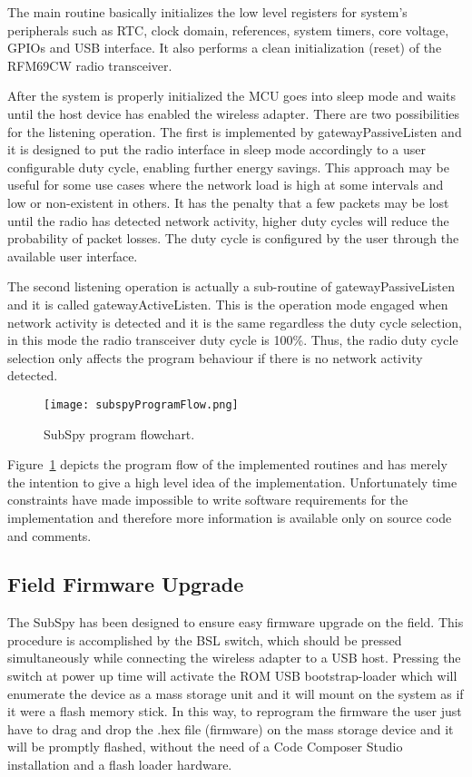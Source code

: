 \documentclass[12pt]{article}
\begin{document}
The main routine basically initializes the low level registers for system's peripherals such as RTC, clock domain, references, system timers, core voltage, GPIOs and USB interface. It also performs a clean initialization (reset) of the RFM69CW radio transceiver.

After the system is properly initialized the MCU goes into sleep mode and waits until the host device has enabled the wireless adapter. There are two possibilities for the listening operation. The first is implemented by gatewayPassiveListen and it is designed to put the radio interface in sleep mode accordingly to a user configurable duty cycle, enabling further energy savings. This approach may be useful for some use cases where the network load is high at some intervals and low or non-existent in others. It has the penalty that a few packets may be lost until the radio has detected network activity, higher duty cycles will reduce the probability of packet losses. The duty cycle is configured by the user through the available user interface.

The second listening operation is actually a sub-routine of gatewayPassiveListen and it is called gatewayActiveListen. This is the operation mode engaged when network activity is detected and it is the same regardless the duty cycle selection, in this mode the radio transceiver duty cycle is 100\%. Thus, the radio duty cycle selection only affects the program behaviour if there is no network activity detected.
  
\begin{figure}[H]
    \centering
    \texttt{[image: subspyProgramFlow.png]}
    \caption{SubSpy program flowchart.}
    \label{fig:subspyProgramFlow}
\end{figure}

Figure~\ref{fig:subspyProgramFlow} depicts the program flow of the implemented routines and has merely the intention to give a high level idea of the implementation. Unfortunately time constraints have made impossible to write software requirements for the implementation and therefore more information is available only on source code and comments.

\subsection{Field Firmware Upgrade}
The SubSpy has been designed to ensure easy firmware upgrade on the field. This procedure is accomplished by the BSL switch, which should be pressed simultaneously while connecting the wireless adapter to a USB host. Pressing the switch at power up time will activate the ROM USB bootstrap-loader which will enumerate the device as a mass storage unit and it will mount on the system as if it were a flash memory stick. In this way, to reprogram the firmware the user just have to drag and drop the .hex file (firmware) on the mass storage device and it will be promptly flashed, without the need of a Code Composer Studio installation and a flash loader hardware.
\end{document}
